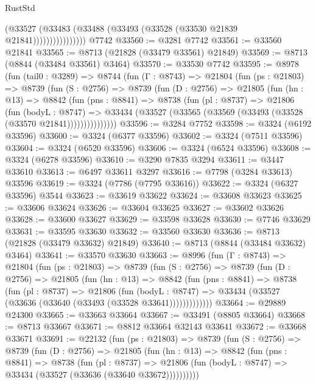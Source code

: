 \begin{lexlean}{RustStd}
\begin{coremodule}
                        (@33527
                          (@33483 (@33488 (@33493 (@33528 (@33530 @21839 @21841))))))))))))))))
    @7742
@33560 := @3281 @7742
@33561 := @33560 @21841
@33565 := @8713 (@21828 (@33479 @33561) @21849)
@33569 := @8713 (@8844 (@33484 @33561) @3464)
@33570 := @33530 @7742
@33595 := @8978
    (fun (tail0 : @3289) =>
    @8744
      (fun (Γ : @8743) =>
      @21804
        (fun (ps : @21803) =>
        @8739
          (fun (S : @2756) =>
          @8739
            (fun (D : @2756) =>
            @21805
              (fun (hn : @13) =>
              @8842
                (fun (pns : @8841) =>
                @8738
                  (fun (pl : @8737) =>
                  @21806
                    (fun (bodyL : @8747) =>
                    @33434 (@33527 (@33565 (@33569 (@33493 (@33528 (@33570 @21841)))))))))))))))
@33596 := @3284 @7752
@33598 := @3324 (@6192 @33596)
@33600 := @3324 (@6377 @33596)
@33602 := @3324 (@7511 @33596)
@33604 := @3324 (@6520 @33596)
@33606 := @3324 (@6524 @33596)
@33608 := @3324 (@6278 @33596)
@33610 := @3290 @7835 @3294
@33611 := @3447 @33610
@33613 := @6497 @33611 @3297
@33616 := @7798 (@3284 @33613) @33596
@33619 := @3324 (@7786 (@7795 @33616))
@33622 := @3324 (@6327 @33596) @3544
@33623 := @33619 @33622
@33624 := @33608 @33623
@33625 := @33606 @33624
@33626 := @33604 @33625
@33627 := @33602 @33626
@33628 := @33600 @33627
@33629 := @33598 @33628
@33630 := @7746 @33629
@33631 := @33595 @33630
@33632 := @33560 @33630
@33636 := @8713 (@21828 (@33479 @33632) @21849)
@33640 := @8713 (@8844 (@33484 @33632) @3464)
@33641 := @33570 @33630
@33663 := @8996
    (fun (Γ : @8743) =>
    @21804
      (fun (ps : @21803) =>
      @8739
        (fun (S : @2756) =>
        @8739
          (fun (D : @2756) =>
          @21805
            (fun (hn : @13) =>
            @8842
              (fun (pns : @8841) =>
              @8738
                (fun (pl : @8737) =>
                @21806
                  (fun (bodyL : @8747) =>
                  @33434 (@33527 (@33636 (@33640 (@33493 (@33528 @33641)))))))))))))
@33664 := @29889 @24300
@33665 := @33663 @33664
@33667 := @33491 (@8805 @33664)
@33668 := @8713 @33667
@33671 := @8812 @33664 @32143 @33641
@33672 := @33668 @33671
@33691 := @22132
    (fun (ps : @21803) =>
    @8739
      (fun (S : @2756) =>
      @8739
        (fun (D : @2756) =>
        @21805
          (fun (hn : @13) =>
          @8842
            (fun (pns : @8841) =>
            @8738
              (fun (pl : @8737) =>
              @21806 (fun (bodyL : @8747) => @33434 (@33527 (@33636 (@33640 @33672))))))))))

\end{coremodule}
\end{lexlean}
